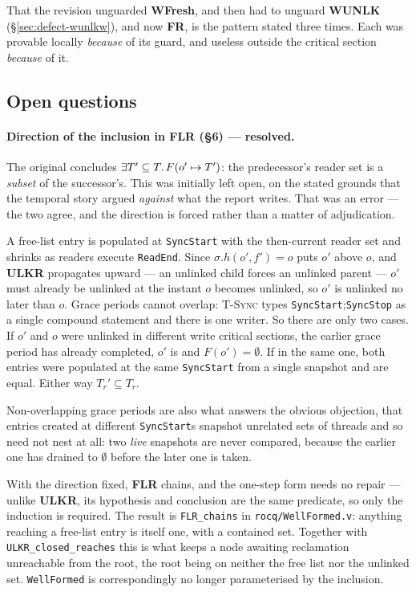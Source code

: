 That the revision unguarded \textbf{WFresh}, and then had to unguard
\textbf{WUNLK} (\S\ref{sec:defect-wunlkw}), and now \textbf{FR}, is the pattern
stated three times.  Each was provable locally \emph{because} of its guard, and
useless outside the critical section \emph{because} of it.

\subsection{Open questions}
\label{sec:inv-open}

\paragraph{Direction of the inclusion in FLR (\S6) --- resolved.}
The original concludes $\exists T' \subseteq T \ldotp F(o' \mapsto T')$: the
predecessor's reader set is a \emph{subset} of the successor's.  This was
initially left open, on the stated grounds that the temporal story argued
\emph{against} what the report writes.  That was an error --- the two agree, and
the direction is forced rather than a matter of adjudication.

A free-list entry is populated at \texttt{SyncStart} with the then-current
reader set and shrinks as readers execute \texttt{ReadEnd}.  Since
$\sigma.h(o',f') = o$ puts $o'$ above $o$, and \textbf{ULKR} propagates upward
--- an unlinked child forces an unlinked parent --- $o'$ must already be
unlinked at the instant $o$ becomes unlinked, so $o'$ is unlinked no later than
$o$.  Grace periods cannot overlap: \textsc{T-Sync} types
\texttt{SyncStart};\texttt{SyncStop} as a single compound statement and there is
one writer.  So there are only two cases.  If $o'$ and $o$ were unlinked in
different write critical sections, the earlier grace period has already
completed, $o'$ is \frbl{} and $F(o') = \emptyset$.  If in the same one, both
entries were populated at the same \texttt{SyncStart} from a single snapshot and
are equal.  Either way $T_{r}' \subseteq T_{r}$.

Non-overlapping grace periods are also what answers the obvious objection, that
entries created at different \texttt{SyncStart}s snapshot unrelated sets of
threads and so need not nest at all: two \emph{live} snapshots are never
compared, because the earlier one has drained to $\emptyset$ before the later
one is taken.

With the direction fixed, \textbf{FLR} chains, and the one-step form needs no
repair --- unlike \textbf{ULKR}, its hypothesis and conclusion are the same
predicate, so only the induction is required.  The result is
\texttt{FLR\_chains} in \texttt{rocq/WellFormed.v}: anything reaching a
free-list entry is itself one, with a contained set.  Together with
\texttt{ULKR\_closed\_reaches} this is what keeps a node awaiting reclamation
unreachable from the root, the root being on neither the free list nor the
unlinked set.  \texttt{WellFormed} is correspondingly no longer parameterised by
the inclusion.

